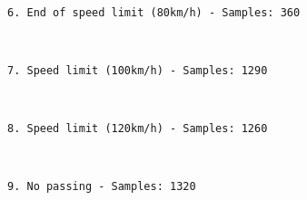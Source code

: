 \documentclass[11pt]{article}
\begin{document}
    \begin{center}
    \end{center}
    { \hspace*{\fill} \\}
    
    \begin{Verbatim}[commandchars=\\\{\}]
6. End of speed limit (80km/h) - Samples: 360

    \end{Verbatim}

    \begin{center}
    \end{center}
    { \hspace*{\fill} \\}
    
    \begin{Verbatim}[commandchars=\\\{\}]
7. Speed limit (100km/h) - Samples: 1290

    \end{Verbatim}

    \begin{center}
    \end{center}
    { \hspace*{\fill} \\}
    
    \begin{Verbatim}[commandchars=\\\{\}]
8. Speed limit (120km/h) - Samples: 1260

    \end{Verbatim}

    \begin{center}
    \end{center}
    { \hspace*{\fill} \\}
    
    \begin{Verbatim}[commandchars=\\\{\}]
9. No passing - Samples: 1320

    \end{Verbatim}

    \begin{center}
    \end{center}
    { \hspace*{\fill} \\}
    
\end{document}

